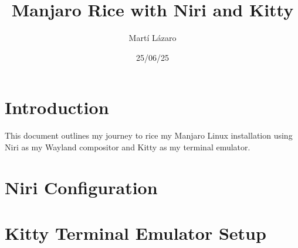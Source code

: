 \documentclass{article}
\title{Manjaro Rice with Niri and Kitty}
\author{Martí Lázaro}
\date{25/06/25}
\begin{document}
\maketitle

\section*{Introduction}
This document outlines my journey to rice my Manjaro Linux installation using Niri as my Wayland compositor and Kitty as my terminal emulator.

\tableofcontents

\section{Niri Configuration}

\section{Kitty Terminal Emulator Setup}
\end{document}
